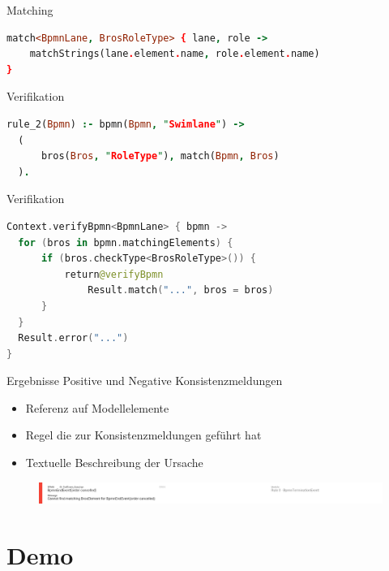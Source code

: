 \begin{frame}[fragile]{Matching}
\begin{lstlisting}[language=Prolog]
match<BpmnLane, BrosRoleType> { lane, role ->
    matchStrings(lane.element.name, role.element.name)
}
\end{lstlisting}
\end{frame}

\begin{frame}[fragile]{Verifikation}
\begin{lstlisting}[language=Prolog]
rule_2(Bpmn) :- bpmn(Bpmn, "Swimlane") ->
  (
      bros(Bros, "RoleType"), match(Bpmn, Bros)
  ).
\end{lstlisting}
\end{frame}
\begin{frame}[fragile]{Verifikation}
\begin{lstlisting}[language=Kotlin]
Context.verifyBpmn<BpmnLane> { bpmn ->
  for (bros in bpmn.matchingElements) {
      if (bros.checkType<BrosRoleType>()) {
          return@verifyBpmn 
              Result.match("...", bros = bros)
      }
  }
  Result.error("...")
}
\end{lstlisting}
\end{frame}


\begin{frame}{Ergebnisse}
  Positive und Negative Konsistenzmeldungen
  \begin{itemize}
    \item Referenz auf Modellelemente
    \item Regel die zur Konsistenzmeldungen geführt hat
    \item Textuelle Beschreibung der Ursache
  \end{itemize}
  \begin{figure}
    \centering
    \begin{adjustbox}{width=1.1\linewidth,center}
      \includegraphics{images/example/error3.png}
    \end{adjustbox}
  \end{figure}
\end{frame}

\section{Demo}